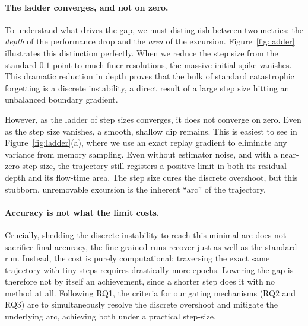 \paragraph{The ladder converges, and not on zero.}
To understand what drives the gap, we must distinguish between two metrics: the \emph{depth} of the performance drop and the \emph{area} of the excursion. Figure~\ref{fig:ladder} illustrates this distinction perfectly. When we reduce the step size from the standard $0.1$ point to much finer resolutions, the massive initial spike vanishes. This dramatic reduction in depth proves that the bulk of standard catastrophic forgetting is a discrete instability, a direct result of a large step size hitting an unbalanced boundary gradient.

However, as the ladder of step sizes converges, it does not converge on zero. Even as the step size vanishes, a smooth, shallow dip remains. This is easiest to see in Figure~\ref{fig:ladder}(a), where we use an exact replay gradient to eliminate any variance from memory sampling. Even without estimator noise, and with a near-zero step size, the trajectory still registers a positive limit in both its residual depth and its flow-time area. The step size cures the discrete overshoot, but this stubborn, unremovable excursion is the inherent ``arc'' of the trajectory.

\paragraph{Accuracy is not what the limit costs.}
Crucially, shedding the discrete instability to reach this minimal arc does not sacrifice final accuracy, the fine-grained runs recover just as well as the standard run. Instead, the cost is purely computational: traversing the exact same trajectory with tiny steps requires drastically more epochs. Lowering the gap is therefore not by itself an achievement, since a shorter step does it with no method at all. Following RQ1, the criteria for our gating mechanisms (RQ2 and RQ3) are to simultaneously resolve the discrete overshoot and mitigate the underlying arc, achieving both under a practical step-size.

